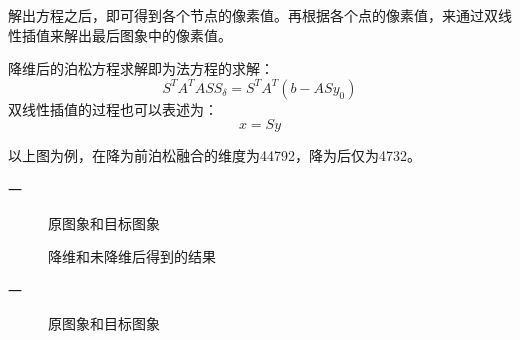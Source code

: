 \documentclass[10pt,twocolumn,letterpaper]{ctexart}
\begin{document}
   解出方程之后，即可得到各个节点的像素值。再根据各个点的像素值，来通过双线性插值来解出最后图象中的像素值。

   降维后的泊松方程求解即为法方程的求解：
   \begin{equation}
      S^T A^T A S S_\delta = S^T A^T (b - ASy_0)
   \end{equation}
   双线性插值的过程也可以表述为：
   \begin{equation}
      x = Sy
   \end{equation}

   \begin{figure}
   \centering
   \end{figure}
   以上图为例，在降为前泊松融合的维度为44792，降为后仅为4732。
   
   \onecolumn
   一

   \begin{figure}[H]
     \centering
     \hspace{1in}
     \caption{原图象和目标图象}
     \label{fig:subfig} %
   \end{figure}

   \begin{figure}[H]
     \centering
     \hspace{1in}
     \caption{降维和未降维后得到的结果}
     \label{fig:subfig} %
   \end{figure}
   \clearpage
   一

   \begin{figure}[H]
     \centering
     \hspace{1in}
     \caption{原图象和目标图象}
     \label{fig:subfig} %
   \end{figure}
\end{document}
